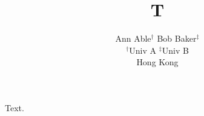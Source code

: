\documentclass{article}
\title{T}
\author{Ann Able$^{\dagger}$ \quad Bob Baker$^{\ddagger}$ \\ $^\dagger$Univ A \quad $^\ddagger$Univ B \\ Hong Kong}
\begin{document}
\maketitle
Text.
\end{document}
